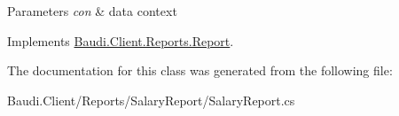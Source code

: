 \begin{DoxyParams}{Parameters}
{\em con} & data context\\
\hline
\end{DoxyParams}


Implements \hyperlink{class_baudi_1_1_client_1_1_reports_1_1_report_a321b93e358b8c0c2d86b4dc049a622d6}{Baudi.\+Client.\+Reports.\+Report}.



The documentation for this class was generated from the following file\+:\begin{DoxyCompactItemize}
\item 
Baudi.\+Client/\+Reports/\+Salary\+Report/Salary\+Report.\+cs\end{DoxyCompactItemize}
